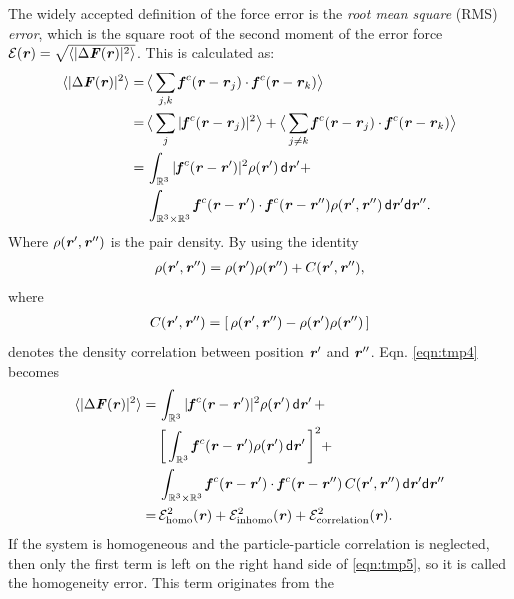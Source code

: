 \documentclass[aps,pre,preprint]{revtex4-1}
\renewcommand{\v}[1]{\textbf{\textit{#1}}}
\renewcommand{\d}[1]{\textsf{#1}}
\begin{document}
The widely accepted definition of the force error is the \emph{root
  mean square} (RMS) \emph{error}, which is the square root of the second
moment of the error force $\mathcal E(\v r) =
\sqrt{\langle\vert\Delta\v F(\v r)\vert^2\rangle}$. This is 
calculated as:
\begin{align} \nonumber
  \langle\vert\Delta\v F(\v r)\vert^2\rangle
  =\,&
  \big\langle\sum_{j,k}\v f^c(\v r - \v r_j)\cdot\v f^c(\v r - \v r_k)\big\rangle \\ \nonumber
  =\,&
  \big\langle\sum_j\vert\v f^c(\v r - \v r_j)\vert^2\big\rangle +
  \big\langle\sum_{j\neq k}\v f^c(\v r - \v r_j)\cdot\v f^c(\v r - \v r_k)\big\rangle \\ \nonumber
  =\,&
  \int_{\mathbb R^3}\vert\v f^c(\v r - \v r')\vert^2\rho(\v r')\,\d d\v r'
  + \\\label{eqn:tmp4}
  \,&
  \int_{\mathbb R^3\times\mathbb R^3}\v f^c(\v r - \v r')\cdot\v f^c(\v r - \v r'')\rho(\v r', \v r'')\,\d d\v r'\d d\v r''.
\end{align}
Where  $\rho(\v r', \v r'')$ is the pair density. By using the identity
\begin{align}  \label{eqn:tmp7}
  \rho(\v r', \v r'')
  = \rho(\v r')\rho(\v r'') + C (\v r', \v r''),
\end{align}
where 
\begin{align}
C (\v r', \v r'') = [\,\rho(\v r', \v r'') -  \rho(\v r')\rho(\v r'')\,]
\end{align}
denotes the density correlation between position $\v r'$ and $\v
r''$. Eqn. \eqref{eqn:tmp4} becomes
\begin{align} \nonumber
  \langle\vert\Delta\v F(\v r)\vert^2\rangle
  = &\,
  \int_{\mathbb R^3}\vert\v f^c(\v r - \v r')\vert^2\rho(\v r')\,\d d\v r' \,+ \\\nonumber
  &\,
  \bigg[\int_{\mathbb R^3}\v f^c(\v r - \v r')\rho(\v r')\,\d d\v r'\,\bigg]^2 + \\\nonumber
  &\,
  \int_{\mathbb R^3\times\mathbb R^3}\v f^c(\v r - \v r')\cdot\v f^c(\v r - \v r'')\,C(\v r', \v r'')\,\d d\v r'\d d\v r'' \\\label{eqn:tmp5}
  = &\,
  \mathcal E^2_{\textrm{homo}}(\v r) +
  \mathcal E^2_{\textrm{inhomo}}(\v r) +
  \mathcal E^2_{\textrm{correlation}}(\v r).
\end{align}
If the system is homogeneous and the particle-particle correlation is
neglected, then only the first term is left on the right hand side of \eqref{eqn:tmp5}, so it
is called the homogeneity error.  This term originates from the
\end{document}
